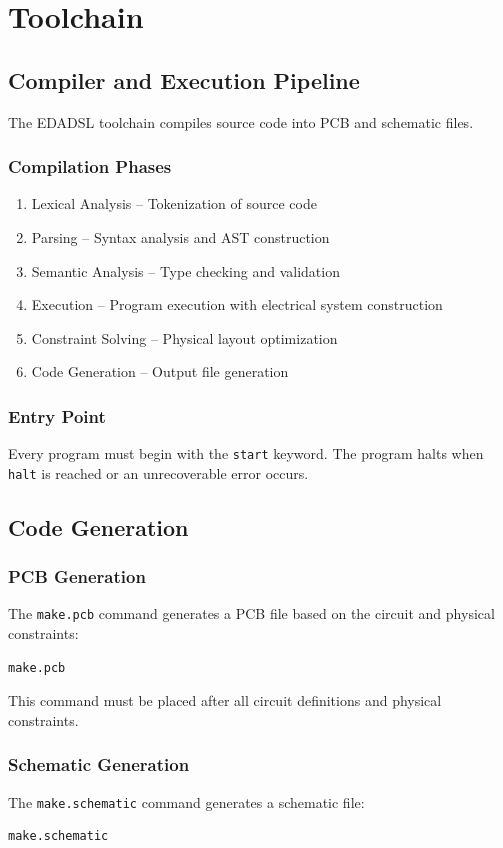 \part{Toolchain}
\chapter{Compiler and Execution Pipeline}
The EDADSL toolchain compiles source code into PCB and schematic files.

\section{Compilation Phases}
\begin{enumerate}
\item Lexical Analysis -- Tokenization of source code
\item Parsing -- Syntax analysis and AST construction
\item Semantic Analysis -- Type checking and validation
\item Execution -- Program execution with electrical system construction
\item Constraint Solving -- Physical layout optimization
\item Code Generation -- Output file generation
\end{enumerate}

\section{Entry Point}
Every program must begin with the \texttt{start} keyword. The program halts when \texttt{halt} is reached or an unrecoverable error occurs.


\chapter{Code Generation}

\section{PCB Generation}
The \texttt{make.pcb} command generates a PCB file based on the circuit and physical constraints:
\begin{verbatim}
make.pcb
\end{verbatim}
This command must be placed after all circuit definitions and physical constraints.

\section{Schematic Generation}
The \texttt{make.schematic} command generates a schematic file:
\begin{verbatim}
make.schematic
\end{verbatim}

